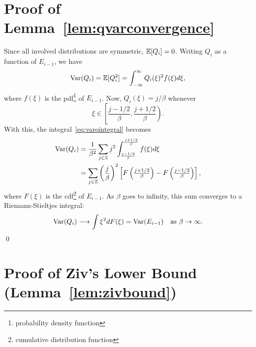 \begin{subappendices}
  \section{Proof of Lemma~\ref{lem:qvarconvergence}}
  \label{app:lemma1proof}

  Since all involved distributions are symmetric, $\mathbb{E}[Q_i] = 0$.  Writing $Q_i$
  as a function of $E_{i-1}$, we have
  \begin{equation}
    \operatorname{Var}(Q_i) = \mathbb{E}[Q_i^2] = \int_{-\infty}^\infty Q_i(\xi)^2 f(\xi) d\xi,
    \label{eq:varqintegral}
  \end{equation}
  where $f(\xi)$ is the pdf\footnote{probability density function} of $E_{i-1}$.
  Now, $Q_i(\xi) = j/\beta$ whenever
  \begin{equation*}
    \xi \in \left[ \frac{j - 1/2}{\beta}, \frac{j + 1/2}{\beta} \right).
  \end{equation*}
  With this, the integral~\eqref{eq:varqintegral} becomes
  \begin{align*}
    \operatorname{Var}(Q_i) &= \frac{1}{\beta^2} \sum_{j \in \mathbb{Z}} j^2 
    \int_{\frac{j - 1/2}{\beta}}^{\frac{j + 1/2}{\beta}} f(\xi) d\xi \\
    &= \sum_{j\in \mathbb{Z}} \left( \frac{j}{\beta} \right)^2 \left[ F\left( 
    { \textstyle
    \frac{j + 1/2}{\beta} }\right) - F \left( { \textstyle \frac{j - 1/2}{\beta}
    } \right) \right],
  \end{align*}
  where $F(\xi)$ is the cdf\footnote{cumulative distribution function} of
  $E_{i-1}$. As $\beta$ goes to infinity, this sum converges to a
  Riemann-Stieltjes integral:
  \begin{equation*}
    \operatorname{Var}(Q_i) \longrightarrow \int \xi^2 dF(\xi) = \operatorname{Var}(E_{i-1}) \quad
    \text{as $\beta \rightarrow \infty$.}
  \end{equation*}
  \qed

  
  \section{Proof of Ziv's Lower Bound (Lemma~\ref{lem:zivbound})}
  \label{app:zivboundproof}


\end{subappendices}
